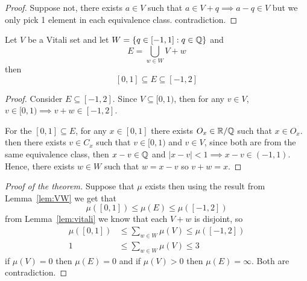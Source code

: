 \begin{proof}
  Suppose not, there exists $a \in V$ such that $a \in V + q\implies a-q \in V$ 
  but we only pick 1 element in each equivalence class. contradiction.  
\end{proof}

\begin{lemma}\label{lem:VW}
  Let $V$ be a Vitali set and let $W = \{q \in [-1, 1] : q \in \mathbb Q\}$ and 
  \[ E = \bigcup_{w \in W}V + w\]
   then 
  \[[0, 1] \subseteq E \subseteq [-1, 2]\]
\end{lemma}

\begin{proof}
  Consider $E \subseteq [-1, 2]$. Since $V \subseteq [0, 1)$, then
  for any $v \in V$, $v \in [0, 1) \implies v + w \in [-1, 2]$.

  For the $[0, 1] \subseteq E$,
  for any $x \in [0, 1]$ there exists $O_x \in \mathbb R/\mathbb Q$ such that $x \in O_x$.
  then there exists $v \in C_x$ such that $v \in [0, 1)$ and $v \in V$, since both
  are from the same equivalence class, then $x - v \in \mathbb Q$ and $|x - v| < 1 \implies x - v \in (-1, 1)$.
  Hence, there exists $w \in W$ such that $w = x-v$ so $v+w = x$.
\end{proof}


\begin{proof}[Proof of the theorem]
  Suppose that $\mu$ exists then using the result from Lemma~\ref{lem:VW} we get that  
  \[ \mu([0, 1]) \leq \mu\left(E\right) \leq \mu([-1, 2])\]
  from Lemma~\ref{lem:vitali} we know that each $V+w$ is disjoint, so
  \begin{align*}
    \mu([0, 1]) &\leq \sum_{w \in W}\mu(V) \leq \mu([-1, 2])\\
    1 &\leq \sum_{w \in W}\mu(V) \leq 3
  \end{align*}
  if $\mu(V) = 0$ then $\mu(E) = 0$ and if $\mu(V) > 0$ then $\mu(E) = \infty$. Both are contradiction. 
\end{proof}



